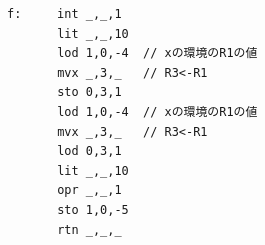 \documentclass{jarticle}
\begin{document}
\begin{verbatim}
f:     int _,_,1
       lit _,_,10
       lod 1,0,-4  // xの環境のR1の値
       mvx _,3,_   // R3<-R1
       sto 0,3,1
       lod 1,0,-4  // xの環境のR1の値
       mvx _,3,_   // R3<-R1
       lod 0,3,1
       lit _,_,10
       opr _,_,1
       sto 1,0,-5
       rtn _,_,_
\end{verbatim}
\end{document}
